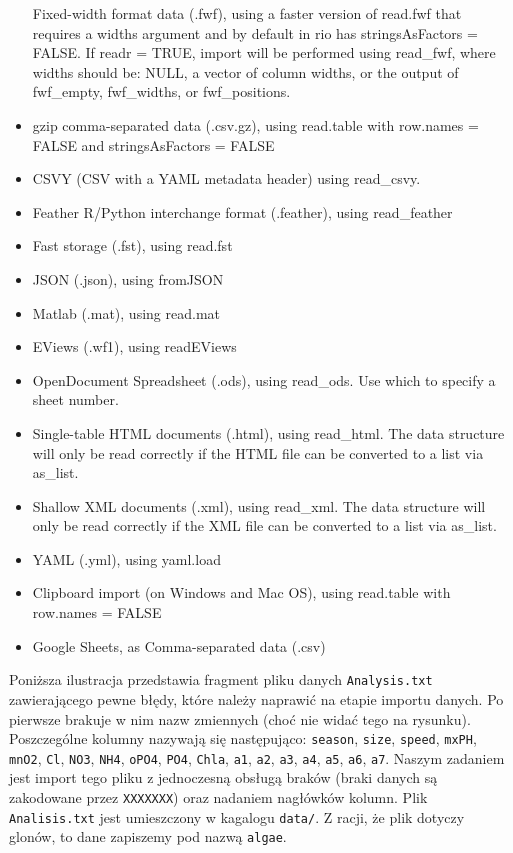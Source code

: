 \documentclass[]{book}
\theoremstyle{plain}
\theoremstyle{definition}
\theoremstyle{definition}
\theoremstyle{definition}
\theoremstyle{definition}
\theoremstyle{remark}
\let\BeginKnitrBlock\begin \let\EndKnitrBlock\end
\begin{document}
\begin{itemize}
  Fixed-width format data (.fwf), using a faster version of read.fwf that requires a widths argument and by default in rio has stringsAsFactors = FALSE. If readr = TRUE, import will be performed using read\_fwf, where widths should be: NULL, a vector of column widths, or the output of fwf\_empty, fwf\_widths, or fwf\_positions.
\item
  gzip comma-separated data (.csv.gz), using read.table with row.names = FALSE and stringsAsFactors = FALSE
\item
  CSVY (CSV with a YAML metadata header) using read\_csvy.
\item
  Feather R/Python interchange format (.feather), using read\_feather
\item
  Fast storage (.fst), using read.fst
\item
  JSON (.json), using fromJSON
\item
  Matlab (.mat), using read.mat
\item
  EViews (.wf1), using readEViews
\item
  OpenDocument Spreadsheet (.ods), using read\_ods. Use which to specify a sheet number.
\item
  Single-table HTML documents (.html), using read\_html. The data structure will only be read correctly if the HTML file can be converted to a list via as\_list.
\item
  Shallow XML documents (.xml), using read\_xml. The data structure will only be read correctly if the XML file can be converted to a list via as\_list.
\item
  YAML (.yml), using yaml.load
\item
  Clipboard import (on Windows and Mac OS), using read.table with row.names = FALSE
\item
  Google Sheets, as Comma-separated data (.csv)
\end{itemize}

\BeginKnitrBlock{example}
\protect\hypertarget{exm:przyk1}{}{\label{exm:przyk1} }Poniższa ilustracja przedstawia fragment pliku danych \texttt{Analysis.txt} zawierającego pewne błędy, które należy naprawić na etapie importu danych. Po pierwsze brakuje w nim nazw zmiennych (choć nie widać tego na rysunku). Poszczególne kolumny nazywają się następująco: \texttt{season}, \texttt{size}, \texttt{speed}, \texttt{mxPH}, \texttt{mnO2}, \texttt{Cl}, \texttt{NO3}, \texttt{NH4}, \texttt{oPO4}, \texttt{PO4}, \texttt{Chla}, \texttt{a1}, \texttt{a2}, \texttt{a3}, \texttt{a4}, \texttt{a5}, \texttt{a6}, \texttt{a7}. Naszym zadaniem jest import tego pliku z jednoczesną obsługą braków (braki danych są zakodowane przez \texttt{XXXXXXX}) oraz nadaniem nagłówków kolumn. Plik \texttt{Analisis.txt} jest umieszczony w kagalogu \texttt{data/}. Z racji, że plik dotyczy glonów, to dane zapiszemy pod nazwą \texttt{algae}.
\EndKnitrBlock{example}
\end{document}
